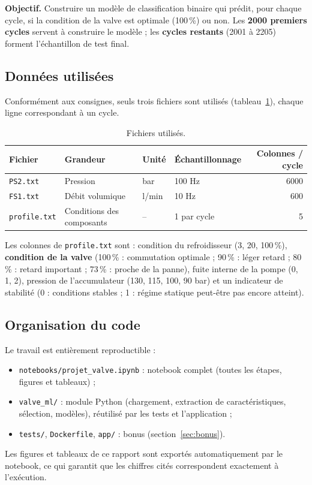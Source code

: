 \documentclass[11pt,a4paper]{article}
\begin{document}
\textbf{Objectif.} Construire un modèle de classification binaire qui prédit, pour chaque
cycle, si la condition de la valve est optimale (100\,\%) ou non. Les \textbf{2000 premiers
cycles} servent à construire le modèle ; les \textbf{\resnTest{} cycles restants} (2001 à 2205)
forment l'échantillon de test final.

\subsection{Données utilisées}
Conformément aux consignes, seuls trois fichiers sont utilisés (tableau~\ref{tab:capteurs}),
chaque ligne correspondant à un cycle.

\begin{table}[H]\centering\small
\caption{Fichiers utilisés.}\label{tab:capteurs}
\begin{tabular}{llllr}
\toprule
Fichier & Grandeur & Unité & Échantillonnage & Colonnes / cycle\\
\midrule
\texttt{PS2.txt} & Pression & bar & 100 Hz & 6000\\
\texttt{FS1.txt} & Débit volumique & l/min & 10 Hz & 600\\
\texttt{profile.txt} & Conditions des composants & -- & 1 par cycle & 5\\
\bottomrule
\end{tabular}
\end{table}

Les colonnes de \texttt{profile.txt} sont : condition du refroidisseur (3, 20, 100\,\%),
\textbf{condition de la valve} (100\,\% : commutation optimale ; 90\,\% : léger retard ;
80\,\% : retard important ; 73\,\% : proche de la panne), fuite interne de la pompe (0, 1, 2),
pression de l'accumulateur (130, 115, 100, 90 bar) et un indicateur de stabilité (0 : conditions
stables ; 1 : régime statique peut-être pas encore atteint).

\subsection{Organisation du code}
Le travail est entièrement reproductible :
\begin{itemize}[nosep]
  \item \texttt{notebooks/projet\_valve.ipynb} : notebook complet (toutes les étapes, figures et tableaux) ;
  \item \texttt{valve\_ml/} : module Python (chargement, extraction de caractéristiques, sélection, modèles),
        réutilisé par les tests et l'application ;
  \item \texttt{tests/}, \texttt{Dockerfile}, \texttt{app/} : bonus (section~\ref{sec:bonus}).
\end{itemize}
Les figures et tableaux de ce rapport sont exportés automatiquement par le notebook, ce qui
garantit que les chiffres cités correspondent exactement à l'exécution.
\end{document}
